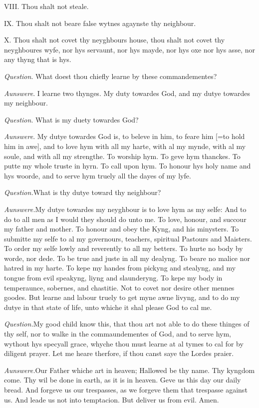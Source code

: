 VIII. Thou shalt not steale. 

IX. Thou shalt not beare false wytnes agaynste thy
neighbour.

X. Thou shalt not covet thy neyghbours house, thou
shalt not covet thy neyghboures wyfe, nor hys servaunt, nor hys mayde,
nor hys oxe nor hys asse, nor any thyng that is hys.

\emph{Question}. What doest thou chiefly learne by
these commandementes?

\emph{Aunswere}. I learne two thynges. My duty towardes
God, and my dutye towardes my neighbour.

\emph{Question}. What is my duety towardes God?

\emph{Aunswere}. My dutye towardes God is, to beleve
in him, to feare him [=to
hold him in awe], and to love hym with all my harte, with al my
mynde, with al my soule, and with all my strengthe. To worship hym. To
geve hym thanckes. To putte my whole truste in hyrn. To call upon hym.
To honour hys holy name and hys woorde, and to serve hym truely all the
dayes of my lyfe.

\emph{Question.}What is thy dutye toward thy neighbour?

\emph{Aunswere.}My dutye towardes my neyghbour is
to love hym as my selfe: And to do to all men as I would they should do
unto me. To love, honour, and succour my father and mother. To honour
and obey the Kyng, and his minysters. To submitte my selfe to al my governours,
teachers, spiritual Pastours and Maisters. To order my selfe lowly and
reverently to all my betters. To hurte no body by worde, nor dede. To
be true and juste in all my dealyng. To beare no malice nor hatred in
my harte. To kepe my handes from pickyng and stealyng, and my tongue from
evil speakyng, liyng and slaunderyng. To kepe my body in temperaunce,
sobernes, and chastitie. Not to covet nor desire other mennes goodes.
But learne and labour truely to get myne awne livyng, and to do my dutye
in that state of life, unto whiche it shal please God to cal me.

\emph{Question.}My good child know this, that thou
art not able to do these thinges of thy self, nor to walke in the commaundementes
of God, and to serve hym, wythout hys specyall grace, whyche thou must
learne at al tymes to cal for by diligent prayer. Let me heare therfore,
if thou canst saye the Lordes praier.

\emph{Aunswere.}Our Father whiche art in heaven; Hallowed
be thy name. Thy kyngdom come. Thy wil be done in earth, as it is in heaven.
Geve us this day our daily bread. And forgeve us our trespasses, as we
forgeve them that trespasse against us. And leade us not into temptacion.
But deliver us from evil. Amen.

